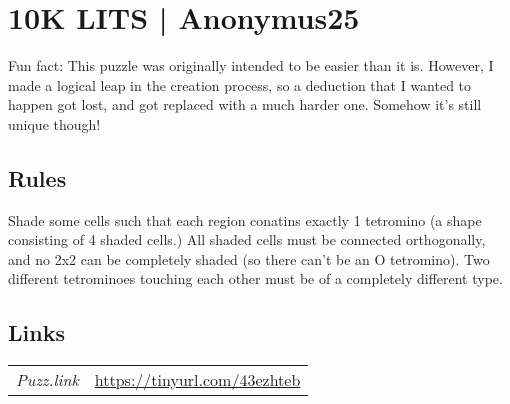\section{10K LITS | {\normalfont Anonymus25}}
\label{sec:19-10k-lits-anonymus25}
Fun fact: This puzzle was originally intended to be easier than it is. However, I made a logical leap in the creation process, so a deduction that I wanted to happen got lost, and got replaced with a much harder one. Somehow it's still unique though!
\subsection*{Rules}
\begin{markdown}
Shade some cells such that each region conatins exactly 1 tetromino (a shape consisting of 4 shaded cells.) All shaded cells must be connected orthogonally, and no 2x2 can be completely shaded (so there can't be an O tetromino). Two different tetrominoes touching each other must be of a  completely different type.
\end{markdown}
\subsection*{Links}
\begin{tabularx}{\textwidth}{l X}
\emph{Puzz.link} & \url{https://tinyurl.com/43ezhteb} \\
\end{tabularx}
\pagebreak
